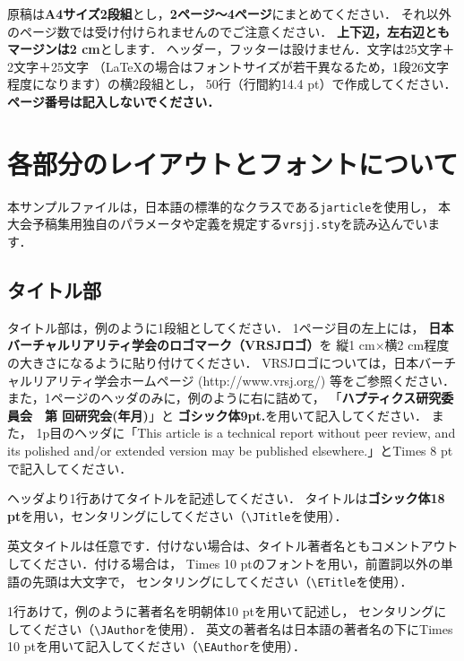 \documentclass[a4paper]{jarticle}
\newcounter{vrsjhdcyear}
\newcounter{vrsjhdcmonth}
\newcounter{vrsjhdcnum}
\begin{document}
原稿は{\bf A4サイズ2段組}とし，{\bf 2ページ～4ページ}にまとめてください．
それ以外のページ数では受け付けられませんのでご注意ください．
{\bf 上下辺，左右辺ともマージンは2 cm}とします．
ヘッダー，フッターは設けません．文字は25文字＋2文字＋25文字
（\LaTeX の場合はフォントサイズが若干異なるため，1段26文字程度になります）の横2段組とし，
50行（行間約14.4 pt）で作成してください．
{\bf ページ番号は記入しないでください．}

\section{各部分のレイアウトとフォントについて}%

本サンプルファイルは，日本語\LaTeXe の標準的なクラスである\verb+jarticle+を使用し，
本大会予稿集用独自のパラメータや定義を規定する\verb+vrsjj.sty+を読み込んでいます．

\subsection{タイトル部}

タイトル部は，例のように1段組としてください．
1ページ目の左上には，
{\bf 日本バーチャルリアリティ学会のロゴマーク（VRSJロゴ）}を
縦1 cm×横2 cm程度の大きさになるように貼り付けてください．
VRSJロゴについては，日本バーチャルリアリティ学会ホームページ
 (http://www.vrsj.org/) 等をご参照ください．
また，1ページのヘッダのみに，例のように右に詰めて，
「{\bf ハプティクス研究委員会　第 回研究会(年月)}」と
{\bf ゴシック体9pt.}を用いて記入してください．
また，
1p目のヘッダに「This article is a technical report without peer review, and its polished and/or extended version may be published elsewhere.」と{\footnotesize Times 8 pt}で記入してください．

ヘッダより1行あけてタイトルを記述してください．
タイトルは{\bf ゴシック体18 pt}を用い，センタリングにしてください（\verb+\JTitle+を使用）．

英文タイトルは任意です．付けない場合は、タイトル著者名ともコメントアウトしてください．付ける場合は，
{\normalsize Times 10 pt}のフォントを用い，前置詞以外の単語の先頭は大文字で，
センタリングにしてください（\verb+\ETitle+を使用）．

1行あけて，例のように著者名を{\normalsize 明朝体10 pt}を用いて記述し，
センタリングにしてください（\verb+\JAuthor+を使用）．
英文の著者名は日本語の著者名の下にTimes 10 ptを用いて記入してください（\verb+\EAuthor+を使用）．
\end{document}
